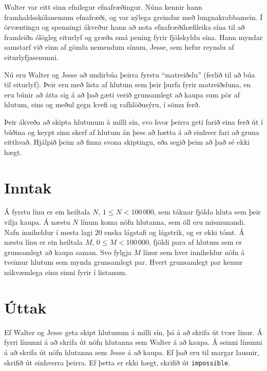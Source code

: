 

Walter var eitt sinn efnilegur efnafræðingur. Núna kennir hann
framhaldsskólanemum efnafræði, og var nýlega greindur með lungnakrabbamein. Í
örvæntingu og spenningi ákveður hann að nota efnafræðihæfileika sína til að
framleiða ólögleg eiturlyf og græða smá pening fyrir fjölskyldu sína. Hann
myndar samstarf við einn af gömlu nemendum sínum, Jesse, sem hefur reynslu af
eiturlyfjasenunni.

Nú eru Walter og Jesse að undirbúa þeirra fyrstu ``matreiðslu'' (ferlið til að
búa til eiturlyf). Þeir eru með lista af hlutum sem þeir þurfa fyrir
matreiðsluna, en eru búnir að átta sig á að það gæti verið grunsamlegt að kaupa
sum pör af hlutum, eins og meðul gegn kvefi og rafhlöðusýru, í sömu ferð.

Þeir ákveða að skipta hlutunum á milli sín, svo hvor þeirra geti farið eina
ferð út í búðina og keypt sinn skerf af hlutum án þess að hætta á að einhver
fari að gruna eitthvað. Hjálpið þeim að finna svona skiptingu, eða segið þeim
að það sé ekki hægt.

\section*{Inntak}
Á fyrstu linu er ein heiltala $N$, $1 \leq N < 100\,000$, sem táknar fjölda
hluta sem þeir vilja kaupa. Á næstu $N$ línum koma nöfn hlutanna, sem öll eru
mismunandi. Nafn inniheldur í mesta lagi $20$ enska lágstafi og lágstrik, og er
ekki tómt. Á næstu línu er ein heiltala $M$, $0 \leq M < 100\,000$, fjöldi para
af hlutum sem er grunsamlegt að kaupa saman. Svo fylgja $M$ línur sem hver
inniheldur nöfn á tveimur hlutum sem mynda grunsamlegt par. Hvert grunsamlegt
par kemur nákvæmlega einu sinni fyrir í listanum.

\section*{Úttak}
Ef Walter og Jesse geta skipt hlutunum á milli sín, þá á að skrifa út tvær
línur. Á fyrri línunni á að skrifa út nöfn hlutanna sem Walter á að kaupa. Á
seinni línunni á að skrifa út nöfn hlutanna sem Jesse á að kaupa. Ef það eru
til margar lausnir, skrifið út einhverra þeirra. Ef þetta er ekki hægt, skrifið
út \texttt{impossible}.

